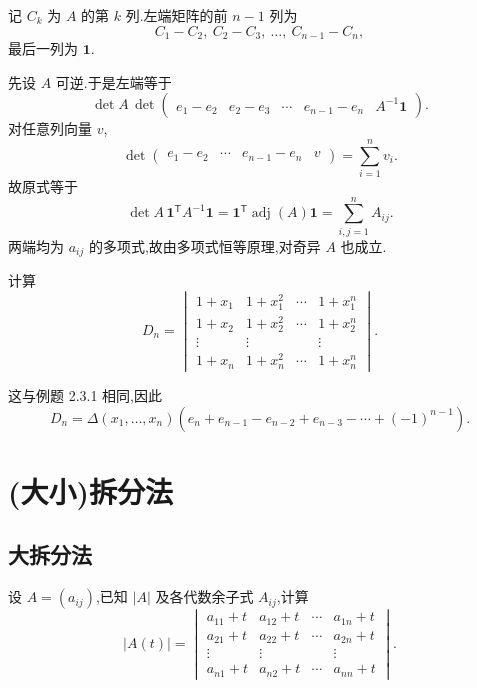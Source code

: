\begin{solution}
记 $C_k$ 为 $A$ 的第 $k$ 列.左端矩阵的前 $n-1$ 列为
\[
C_1-C_2,\ C_2-C_3,\ \ldots,\ C_{n-1}-C_n,
\]
最后一列为 $\boldsymbol{1}$.

先设 $A$ 可逆.于是左端等于
\[
\det A\,
\det
\begin{pmatrix}
e_1-e_2& e_2-e_3&\cdots&e_{n-1}-e_n&A^{-1}\boldsymbol{1}
\end{pmatrix}.
\]
对任意列向量 $v$,
\[
\det
\begin{pmatrix}
e_1-e_2&\cdots&e_{n-1}-e_n&v
\end{pmatrix}
=
\sum\limits_{i=1}^{n}v_i.
\]
故原式等于
\[
\det A\,
\boldsymbol{1}^{\mathsf T}A^{-1}\boldsymbol{1}
=
\boldsymbol{1}^{\mathsf T}\operatorname{adj}(A)\boldsymbol{1}
=
\sum\limits_{i,j=1}^{n}A_{ij}.
\]
两端均为 $a_{ij}$ 的多项式,故由多项式恒等原理,对奇异 $A$ 也成立.
\end{solution}


\begin{example}
计算
\[
D_n=
\begin{vmatrix}
1+x_1&1+x_1^2&\cdots&1+x_1^n\\
1+x_2&1+x_2^2&\cdots&1+x_2^n\\
\vdots&\vdots&&\vdots\\
1+x_n&1+x_n^2&\cdots&1+x_n^n
\end{vmatrix}.
\]
\end{example}
\exampleblank

\begin{solution}
这与例题 2.3.1 相同,因此
\[
\boxed{
D_n
=
\Delta(x_1,\ldots,x_n)
\left(
e_n+e_{n-1}-e_{n-2}+e_{n-3}-\cdots+(-1)^{n-1}
\right)
}.
\]
\end{solution}


\newpage

\section{(大小)拆分法}

\subsection{大拆分法}

\begin{example}[\markstar]
设 $A=(a_{ij})$,已知 $|A|$ 及各代数余子式 $A_{ij}$,计算
\[
|A(t)|
=
\begin{vmatrix}
a_{11}+t&a_{12}+t&\cdots&a_{1n}+t\\
a_{21}+t&a_{22}+t&\cdots&a_{2n}+t\\
\vdots&\vdots&&\vdots\\
a_{n1}+t&a_{n2}+t&\cdots&a_{nn}+t
\end{vmatrix}.
\]
\end{example}
\exampleblank

